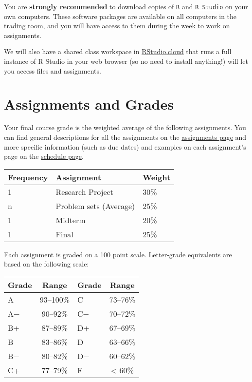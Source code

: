\documentclass{article}
\begin{document}
You are \textbf{strongly recommended} to download copies of
\href{https://www.r-project.org/}{\texttt{R}} and
\href{http://www.rstudio.com}{\texttt{R\ Studio}} on your own computers.
These software packages are available on all computers in the trading
room, and you will have access to them during the week to work on
assignments.

We will also have a shared class workspace in
\href{http://rstudio.cloud/}{RStudio.cloud} that runs a full instance of
R Studio in your web browser (so no need to install anything!) will let
you access files and assignments.

\hypertarget{assignments-and-grades}{%
\section{Assignments and Grades}\label{assignments-and-grades}}

Your final course grade is the weighted average of the following
assignments. You can find general descriptions for all the assignments
on the \href{assignments/}{assignments page} and more specific
information (such as due dates) and examples on each assignment's page
on the \href{schedule/}{schedule page}.

\begin{tabular}{l|l|l}
\hline
Frequency & Assignment & Weight\\
\hline
1 & Research Project & 30\%\\
\hline
n & Problem sets (Average) & 25\%\\
\hline
1 & Midterm & 20\%\\
\hline
1 & Final & 25\%\\
\hline
\end{tabular}

Each assignment is graded on a 100 point scale. Letter-grade equivalents
are based on the following scale:

\begin{table}
\centering
\begin{tabular}{l|c|l|c}
\hline
Grade & Range & Grade & Range\\
\hline
A & 93–100\% & C & 73–76\%\\
\hline
A− & 90–92\% & C− & 70–72\%\\
\hline
B+ & 87–89\% & D+ & 67–69\%\\
\hline
B & 83–86\% & D & 63–66\%\\
\hline
B− & 80–82\% & D− & 60–62\%\\
\hline
C+ & 77–79\% & F & < 60\%\\
\hline
\end{tabular}
\end{table}
\end{document}
